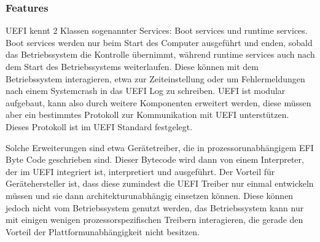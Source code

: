 \documentclass[12pt,ngerman,twopage]{scrartcl}
\begin{document}
\subsubsection{Features}
UEFI kennt 2 Klassen sogenannter Services: Boot services und runtime services. Boot services werden nur beim Start des Computer ausgeführt und enden, sobald das Betriebssystem die Kontrolle übernimmt, während runtime services auch nach dem Start des Betriebssystems weiterlaufen. Diese können mit dem Betriebssystem interagieren, etwa zur Zeiteinstellung oder um Fehlermeldungen nach einem Systemcrash in das UEFI Log zu schreiben.
UEFI ist modular aufgebaut, kann also durch weitere Komponenten erweitert werden, diese müssen aber ein bestimmtes Protokoll zur Kommunikation mit UEFI unterstützen. Dieses Protokoll ist im UEFI Standard festgelegt.

Solche Erweiterungen sind etwa Gerätetreiber, die in prozessorunabhängigem EFI Byte Code geschrieben sind. Dieser Bytecode wird dann von einem Interpreter, der im UEFI integriert ist, interpretiert und ausgeführt. Der Vorteil für Gerätehersteller ist, dass diese zumindest die UEFI Treiber nur einmal entwickeln müssen und sie dann architekturunabhängig einsetzen können. Diese können jedoch nicht vom Betriebssystem genutzt werden, das Betriebssystem kann nur mit einigen wenigen prozessorspezifischen Treibern interagieren, die gerade den Vorteil der Plattformunabhängigkeit nicht besitzen.
\end{document}
